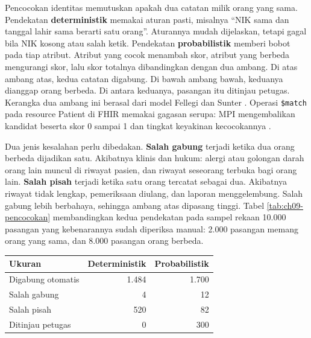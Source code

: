 \begin{pendalaman}[title={Pendalaman Teknis (opsional): Pencocokan Deterministik dan Probabilistik}]
Pencocokan identitas memutuskan apakah dua catatan milik orang yang sama.
Pendekatan \textbf{deterministik} memakai aturan pasti, misalnya ``NIK sama
dan tanggal lahir sama berarti satu orang''. Aturannya mudah dijelaskan,
tetapi gagal bila NIK kosong atau salah ketik. Pendekatan
\textbf{probabilistik} memberi bobot pada tiap atribut. Atribut yang cocok
menambah skor, atribut yang berbeda mengurangi skor, lalu skor totalnya
dibandingkan dengan dua ambang. Di atas ambang atas, kedua catatan digabung.
Di bawah ambang bawah, keduanya dianggap orang berbeda. Di antara keduanya,
pasangan itu ditinjau petugas. Kerangka dua ambang ini berasal dari model
Fellegi dan Sunter \cite{c09-fellegi1969}. Operasi \texttt{\$match} pada
resource Patient di FHIR memakai gagasan serupa: MPI mengembalikan kandidat
beserta skor 0 sampai 1 dan tingkat keyakinan kecocokannya
\cite{c09-fhir-match}.

\medskip
Dua jenis kesalahan perlu dibedakan. \textbf{Salah gabung} terjadi ketika
dua orang berbeda dijadikan satu. Akibatnya klinis dan hukum: alergi atau
golongan darah orang lain muncul di riwayat pasien, dan riwayat seseorang
terbuka bagi orang lain. \textbf{Salah pisah} terjadi ketika satu orang
tercatat sebagai dua. Akibatnya riwayat tidak lengkap, pemeriksaan diulang,
dan laporan menggelembung. Salah gabung lebih berbahaya, sehingga ambang atas
dipasang tinggi. Tabel \ref{tab:ch09-pencocokan} membandingkan kedua
pendekatan pada sampel rekaan 10.000 pasangan yang kebenarannya sudah
diperiksa manual: 2.000 pasangan memang orang yang sama, dan 8.000 pasangan
orang berbeda.

\begin{center}
  \label{tab:ch09-pencocokan}
  \small
  \begin{tabularx}{\linewidth}{Xrr}
    \hline
    \textbf{Ukuran} & \textbf{Deterministik} & \textbf{Probabilistik} \\
    \hline
    Digabung otomatis & 1.484 & 1.700 \\
    \hline
    Salah gabung & 4 & 12 \\
    \hline
    Salah pisah & 520 & 82 \\
    \hline
    Ditinjau petugas & 0 & 300 \\
    \hline
  \end{tabularx}
\end{center}


\end{pendalaman}
